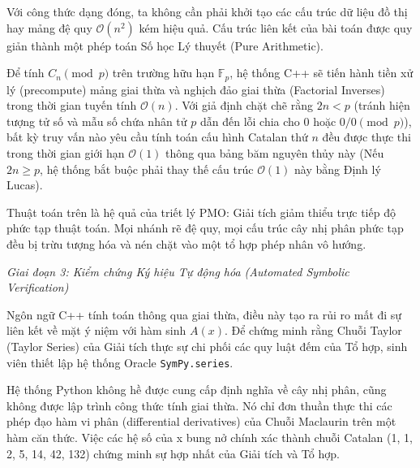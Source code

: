 \documentclass{article}
\begin{document}
Với công thức dạng đóng, ta không cần phải khởi tạo các cấu trúc dữ liệu đồ thị hay mảng đệ quy $\mathcal{O}(n^2)$ kém hiệu quả. Cấu trúc liên kết của bài toán được quy giản thành một phép toán Số học Lý thuyết (Pure Arithmetic). 

Để tính $C_n \pmod p$ trên trường hữu hạn $\mathbb{F}_p$, hệ thống C++ sẽ tiến hành tiền xử lý (precompute) mảng giai thừa và nghịch đảo giai thừa (Factorial Inverses) trong thời gian tuyến tính $\mathcal{O}(n)$. Với giả định chặt chẽ rằng $2n < p$ (tránh hiện tượng tử số và mẫu số chứa nhân tử $p$ dẫn đến lỗi chia cho 0 hoặc $0/0 \pmod p$), bất kỳ truy vấn nào yêu cầu tính toán cấu hình Catalan thứ $n$ đều được thực thi trong thời gian giới hạn $\mathcal{O}(1)$ thông qua bảng băm nguyên thủy này (Nếu $2n \ge p$, hệ thống bắt buộc phải thay thế cấu trúc $\mathcal{O}(1)$ này bằng Định lý Lucas).

Thuật toán trên là hệ quả của triết lý PMO: Giải tích giảm thiểu trực tiếp độ phức tạp thuật toán. Mọi nhánh rẽ đệ quy, mọi cấu trúc cây nhị phân phức tạp đều bị trừu tượng hóa và nén chặt vào một tổ hợp phép nhân vô hướng.

\vspace{0.5em}\noindent\emph{Giai đoạn 3: Kiểm chứng Ký hiệu Tự động hóa (Automated Symbolic Verification)}

Ngôn ngữ C++ tính toán thông qua giai thừa, điều này tạo ra rủi ro mất đi sự liên kết về mặt ý niệm với hàm sinh $A(x)$. Để chứng minh rằng Chuỗi Taylor (Taylor Series) của Giải tích thực sự chi phối các quy luật đếm của Tổ hợp, sinh viên thiết lập hệ thống Oracle \texttt{\textsf{SymPy}.series}.

Hệ thống Python không hề được cung cấp định nghĩa về cây nhị phân, cũng không được lập trình công thức tính giai thừa. Nó chỉ đơn thuần thực thi các phép đạo hàm vi phân (differential derivatives) của Chuỗi Maclaurin trên một hàm căn thức. Việc các hệ số của x bung nở chính xác thành chuỗi Catalan (1, 1, 2, 5, 14, 42, 132) chứng minh sự hợp nhất của Giải tích và Tổ hợp.
\end{document}
